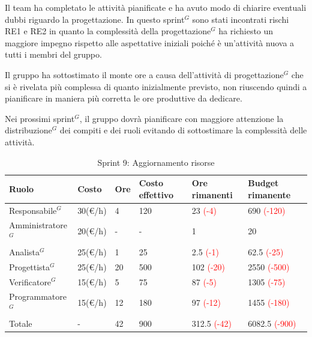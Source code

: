 Il team ha completato le attività pianificate e ha avuto modo di chiarire eventuali dubbi riguardo la progettazione.
In questo sprint$^G$ sono stati incontrati rischi RE1 e RE2 in quanto la complessità della progettazione$^G$ ha richiesto un maggiore impegno rispetto alle aspettative iniziali poiché è un'attività nuova a tutti i membri del gruppo.

Il gruppo ha sottostimato il monte ore a causa dell'attività di progettazione$^G$ che si è rivelata più complessa di quanto inizialmente previsto, non riuscendo quindi a pianificare in maniera più corretta le ore produttive da dedicare.

Nei prossimi sprint$^G$, il gruppo dovrà pianificare con maggiore attenzione la distribuzione$^G$ dei compiti e dei ruoli evitando di sottostimare la complessità delle attività.

\begin{table}[H]
	\centering
	\begin{tabular}{|p{}|p{}|p{}|p{}|p{}|p{}|}
		\hline
		\rowcolor{gray!25}
		Ruolo & Costo & Ore & Costo \newline effettivo & Ore \newline rimanenti & Budget \newline rimanente \\ \hline
		
		Responsabile$^G$
		& 30(€/h) & 4 & 120
		& 23 \textcolor{red}{(-4)}
		& 690 \textcolor{red}{(-120)} \\ \hline
		
		Amministratore$^G$
		& 20(€/h) & - & -
		& 1
		& 20 \\ \hline
		
		Analista$^G$
		& 25(€/h) & 1 & 25
		& 2.5 \textcolor{red}{(-1)}
		& 62.5 \textcolor{red}{(-25)} \\ \hline
		
		Progettista$^G$
		& 25(€/h) & 20 & 500
		& 102 \textcolor{red}{(-20)}
		& 2550 \textcolor{red}{(-500)}\\ \hline
		
		Verificatore$^G$
		& 15(€/h) & 5 & 75
		& 87 \textcolor{red}{(-5)}
		& 1305 \textcolor{red}{(-75)} \\ \hline
		
		Programmatore$^G$
		& 15(€/h) & 12 & 180
		& 97 \textcolor{red}{(-12)}
		& 1455 \textcolor{red}{(-180)} \\ \hline
		
		Totale
		& - & 42 & 900
		& 312.5 \textcolor{red}{(-42)}
		& 6082.5 \textcolor{red}{(-900)} \\ \hline
	\end{tabular}
	\caption{Sprint 9: Aggiornamento risorse}
\end{table}